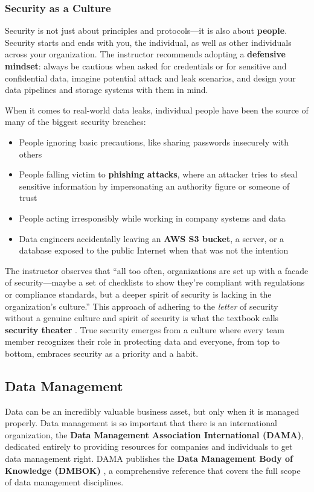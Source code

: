 \documentclass{article}
\begin{document}
\subsubsection{Security as a Culture}
Security is not just about principles and protocols---it is also about \textbf{people}. Security starts and ends with you, the individual, as well as other individuals across your organization. The instructor recommends adopting a \textbf{defensive mindset}: always be cautious when asked for credentials or for sensitive and confidential data, imagine potential attack and leak scenarios, and design your data pipelines and storage systems with them in mind.

When it comes to real-world data leaks, individual people have been the source of many of the biggest security breaches:
\begin{itemize}
    \item People ignoring basic precautions, like sharing passwords insecurely with others
    \item People falling victim to \textbf{phishing attacks}, where an attacker tries to steal sensitive information by impersonating an authority figure or someone of trust
    \item People acting irresponsibly while working in company systems and data
    \item Data engineers accidentally leaving an \textbf{AWS S3 bucket}, a server, or a database exposed to the public Internet when that was not the intention
\end{itemize}

The instructor observes that ``all too often, organizations are set up with a facade of security---maybe a set of checklists to show they're compliant with regulations or compliance standards, but a deeper spirit of security is lacking in the organization's culture.'' This approach of adhering to the \textit{letter} of security without a genuine culture and spirit of security is what the textbook calls \textbf{security theater} \cite{reis2022fundamentals}. True security emerges from a culture where every team member recognizes their role in protecting data and everyone, from top to bottom, embraces security as a priority and a habit.

\subsection{Data Management}
\label{sec:data-management}
Data can be an incredibly valuable business asset, but only when it is managed properly. Data management is so important that there is an international organization, the \textbf{Data Management Association International (DAMA)}, dedicated entirely to providing resources for companies and individuals to get data management right. DAMA publishes the \textbf{Data Management Body of Knowledge (DMBOK)} \cite{dama2017dmbok}, a comprehensive reference that covers the full scope of data management disciplines.
\end{document}

